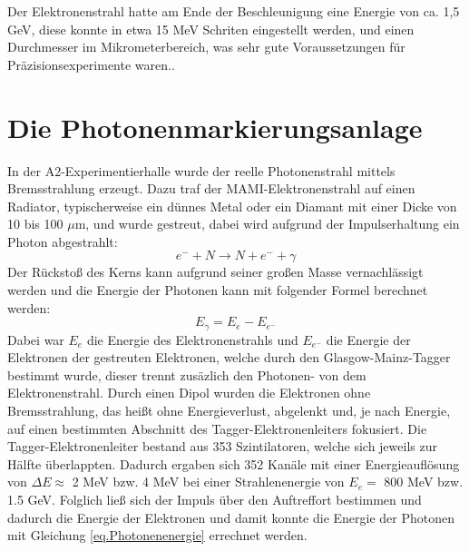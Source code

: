 \documentclass[a4paper,11pt,oneside,final,german,openbib,pdftex]{scrbook}
\begin{document}
 Der Elektronenstrahl hatte am Ende der Beschleunigung eine Energie von ca. 1,5 GeV, diese konnte in etwa 15 MeV Schriten eingestellt werden, und einen Durchmesser im Mikrometerbereich, was sehr gute Voraussetzungen f\"ur Pr\"azisionsexperimente waren.\cite{KPh07}. 
 
 
 \section{Die Photonenmarkierungsanlage}
 
 In der A2-Experimentierhalle wurde der reelle Photonenstrahl mittels Bremsstrahlung erzeugt. Dazu traf der MAMI-Elektronenstrahl auf einen Radiator, typischerweise ein d\"unnes Metal oder ein Diamant mit einer Dicke von 10 bis 100 $\mu$m, und wurde gestreut, dabei wird aufgrund der Impulserhaltung ein Photon abgestrahlt:
 \begin{equation}
 e^{-}+N\rightarrow N + e^{-}+\gamma
 \label{eq.Streuung}
 \end{equation}
  Der R\"ucksto{\ss} des Kerns kann aufgrund seiner gro{\ss}en Masse vernachl\"assigt werden und die Energie der Photonen kann mit folgender Formel berechnet werden:
  \begin{equation}
  E_{\gamma}= E_{e^{}}-E_{e^-}
  \label{eq.Photonenenergie}
  \end{equation}
 Dabei war $E_e$ die Energie des Elektronenstrahls und $E_{e^-}$ die Energie der Elektronen der gestreuten Elektronen, welche durch den Glasgow-Mainz-Tagger bestimmt wurde, dieser trennt zus\"azlich den Photonen- von dem Elektronenstrahl. Durch einen Dipol wurden die Elektronen ohne Bremsstrahlung, das hei{\ss}t ohne Energieverlust, abgelenkt und, je nach Energie, auf einen bestimmten Abschnitt des Tagger-Elektronenleiters fokusiert. Die Tagger-Elektronenleiter bestand aus 353 Szintilatoren, welche sich jeweils zur H\"alfte \"uberlappten. Dadurch ergaben sich 352 Kan\"ale mit einer Energieaufl\"osung von $\Delta E \approx$  2 MeV bzw. 4 MeV bei einer Strahlenenergie von $E_e=$ 800 MeV bzw. 1.5 GeV. Folglich lie{\ss} sich der Impuls \"uber den Auftreffort bestimmen und dadurch die Energie der Elektronen und damit konnte die Energie der Photonen mit Gleichung \ref{eq.Photonenenergie} errechnet werden\cite{We13}.
\newline 
\end{document}
